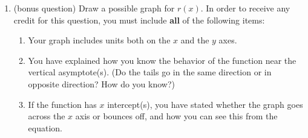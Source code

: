 \documentclass[12pt,dvipsnames]{article}
\begin{document}
\begin{enumerate}[label=\arabic*., leftmargin=2\parindent,
labelindent=\parindent, labelsep=*]
\begin{enumerate}
	\item (bonus question) 	Draw a possible graph for $r(x)$. In order to receive any credit for this question, you must include {\bfseries{all}} of the following items:
	\begin{enumerate}
		\item Your graph includes units both on the $x$ and the $y$ axes.
		\item You have explained how you know the behavior of the function near the vertical asymptote(s). (Do the tails go in the same direction or in opposite direction? How do you know?)
		\item If the function has $x$ intercept(s), you have stated whether the graph goes across the $x$ axis or bounces off, and how you can see this from the equation.
	\end{enumerate}
\end{enumerate}
		
\end{enumerate}
		
\end{document}
